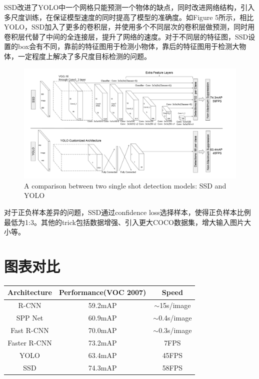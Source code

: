 \documentclass[12pt,onecolumn]{article}
\begin{document}
    SSD改进了YOLO中一个网格只能预测一个物体的缺点，同时改进网络结构，引入多尺度训练，在保证模型速度的同时提高了模型的准确度。如Figure 5所示，相比YOLO，SSD加入了更多的卷积层，并使用多个不同层次的卷积层做预测，同时用卷积层代替了中间的全连接层，提升了网络的速度。对于不同层的特征图，SSD设置的box会有不同，靠前的特征图用于检测小物体，靠后的特征图用于检测大物体，一定程度上解决了多尺度目标检测的问题。

    \begin{figure}[htb]
        \centering
        \includegraphics[width=\linewidth]{figure/ssd.png}
        \caption{A comparison between two single shot detection models: SSD and YOLO}
    \end{figure}

    对于正负样本差异的问题，SSD通过confidence loss选择样本，使得正负样本比例最低为1:3。其他的trick包括数据增强、引入更大COCO数据集，增大输入图片大小等。


    \section{图表对比}

    \begin{table}[H]
    \begin{tabular}{|c|c|c|}
        \hline
        Architecture & Performance(VOC 2007) & Speed            \\ \hline
        R-CNN        & 59.2mAP               & $\sim$15s/image  \\ \hline
        SPP Net      & 60.9mAP               & $\sim$0.4s/image \\ \hline
        Fast R-CNN   & 70.0mAP               & $\sim$0.3s/image \\ \hline
        Faster R-CNN & 73.2mAP               & 7FPS             \\ \hline
        YOLO         & 63.4mAP               & 45FPS            \\ \hline
        SSD          & 74.3mAP               & 58FPS            \\ \hline
    \end{tabular}
    \end{table}


    {\small
     
    
    }
\end{document}

